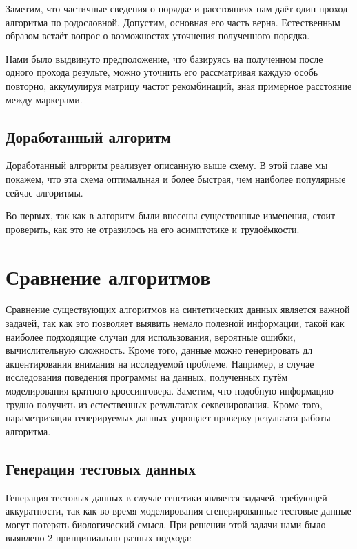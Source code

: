 \documentclass{matmex-diploma-custom}
\begin{document}
Заметим, что частичные сведения о порядке и расстояниях нам даёт один
проход алгоритма по родословной. Допустим, основная его часть
верна. Естественным образом встаёт вопрос о возможностях уточнения
полученного порядка.

Нами было выдвинуто предположение, что базируясь на полученном после
одного прохода результе, можно уточнить его рассматривая каждую особь
повторно, аккумулируя матрицу частот рекомбинаций, зная примерное
расстояние между маркерами.

\subsection{Доработанный алгоритм}



Доработанный алгоритм реализует описанную выше схему. В этой главе мы
покажем, что эта схема оптимальная и более быстрая, чем наиболее
популярные сейчас алгоритмы.

Во-первых, так как в алгоритм были внесены существенные изменения,
стоит проверить, как это не отразилось на его асимптотике и
трудоёмкости.

\section{Сравнение алгоритмов}

Сравнение существующих алгоритмов на синтетических данных является
важной задачей, так как это позволяет выявить немало полезной
информации, такой как наиболее подходящие случаи для использования,
вероятные ошибки, вычислительную сложность. Кроме того, данные можно
генерировать дл акцентирования внимания на исследуемой
проблеме. Например, в случае исследования поведения программы на
данных, полученных путём моделирования кратного
кроссинговера. Заметим, что подобную информацию трудно получить из
естественных результатах секвенирования. Кроме того, параметризация
генерируемых данных упрощает проверку результата работы алгоритма.

\subsection{Генерация тестовых данных}

Генерация тестовых данных в случае генетики является задачей,
требующей аккуратности, так как во время моделирования сгенерированные
тестовые данные могут потерять биологический смысл.  При решении
этой задачи нами было выявлено 2 принципиально разных подхода:
\end{document}
